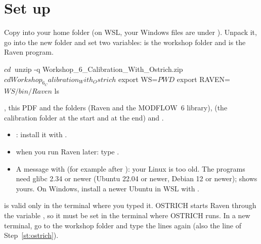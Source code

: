 \section{Set up}

\label{st:unpack}
Copy  into your home folder (on WSL, your Windows files are under
). Unpack it, go into the new folder and set two variables:  is the workshop folder and 
is the Raven program.
\begin{shell}
$ cd ~
$ unzip -q Workshop_6_Calibration_With_Ostrich.zip
$ cd Workshop_6_Calibration_With_Ostrich
$ export WS=$PWD
$ export RAVEN=$WS/bin/Raven
$ ls
\end{shell}
\see {}, this PDF and the folders  (Raven and the MODFLOW~6 library),  (the calibration
folder at the start and at the end) and .
\begin{trouble}
\begin{itemize}
\item {}: install it with .
\item {} when you run Raven later: type .
\item A message with  (for example after ): your Linux is too old. The programs need glibc 2.34 or newer (Ubuntu 22.04 or newer, Debian 12 or newer);  shows yours. On Windows, install a newer Ubuntu in WSL with .
\end{itemize}
\end{trouble}
\begin{note}
 is valid only in the terminal where you typed it. OSTRICH starts Raven through the variable , so
it must be set in the terminal where OSTRICH runs. In a new terminal, go to the workshop folder and type the 
lines again (also the  line of Step~\ref{st:ostrich}).
\end{note}

